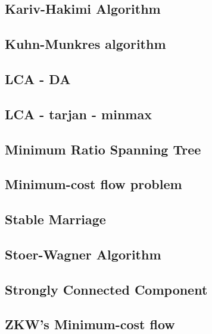 \documentclass[a4paper,5pt,titlepage]{article}
\begin{document}
\subsection{Kariv-Hakimi Algorithm}

\subsection{Kuhn-Munkres algorithm}

\subsection{LCA - DA}

\subsection{LCA - tarjan - minmax}

\subsection{Minimum Ratio Spanning Tree}

\subsection{Minimum-cost flow problem}

\subsection{Stable Marriage}

\subsection{Stoer-Wagner Algorithm}

\subsection{Strongly Connected Component}

\subsection{ZKW's Minimum-cost flow}

\end{document}
